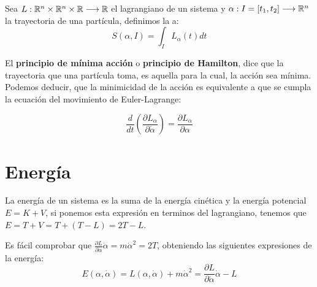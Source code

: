 \begin{definition}
    Sea $L:\mathbb{R}^n\times\mathbb{R}^n\times\mathbb{R}\longrightarrow \mathbb{R}$ el lagrangiano de un sistema y $\alpha:I=[t_1, t_2]\longrightarrow \mathbb{R}^n$ la trayectoria de una partícula, definimos la  a:
    \begin{equation}
        \label{eq:accion}
        S(\alpha,I)=\int_{I}L_\alpha(t) dt
    \end{equation}
\end{definition}

El \textbf{principio de mínima acción} o \textbf{principio de Hamilton}, dice que la trayectoria que una partícula toma, es aquella para la cual, la acción sea mínima.
Podemos deducir, que la minimicidad de la acción es equivalente a que se cumpla la ecuación del movimiento de Euler-Lagrange:
\begin{postulate}
    \begin{equation}
        \label{eq:euler_lagrange}
        \frac{d}{dt}\left(\frac{\partial L_\alpha}{\partial \dot{\alpha}}\right)=\frac{\partial L_\alpha}{\partial \alpha}
    \end{equation}
\end{postulate}


\section{Energía}
La energía de un sistema es la suma de la energía cinética y la energía potencial $E=K+V$, si ponemos esta expresión en terminos del lagrangiano, tenemos que $E=T+V=T+(T-L)=2T-L$.

Es fácil comprobar que $\frac{\partial L}{\partial\dot{\alpha}}\dot{\alpha}=m\dot{\alpha}^2=2T$, obteniendo las siguientes expresiones de la energía:
\begin{equation}
    \label{eq:energia_lagrangiana}
    E(\alpha, \dot{\alpha})=L(\alpha, \dot{\alpha})+m\dot{\alpha}^2=\frac{\partial L}{\partial\dot{\alpha}}\dot{\alpha}-L
\end{equation}


